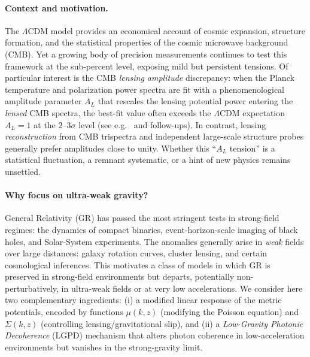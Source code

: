 \paragraph{Context and motivation.}
The $\Lambda$CDM model provides an economical account of cosmic expansion, structure formation, and the statistical properties of the cosmic microwave background (CMB). Yet a growing body of precision measurements continues to test this framework at the sub-percent level, exposing mild but persistent tensions. Of particular interest is the CMB \emph{lensing amplitude} discrepancy: when the Planck temperature and polarization power spectra are fit with a phenomenological amplitude parameter $A_L$ that rescales the lensing potential power entering the \emph{lensed} CMB spectra, the best-fit value often exceeds the $\Lambda$CDM expectation $A_L=1$ at the $2$--$3\sigma$ level (see e.g.\ \cite{Planck2018_params,Planck2018_lensing} and follow-ups). In contrast, lensing \emph{reconstruction} from CMB trispectra and independent large-scale structure probes generally prefer amplitudes close to unity. Whether this ``$A_L$ tension'' is a statistical fluctuation, a remnant systematic, or a hint of new physics remains unsettled.

\paragraph{Why focus on ultra-weak gravity?}
General Relativity (GR) has passed the most stringent tests in strong-field regimes: the dynamics of compact binaries, event-horizon-scale imaging of black holes, and Solar-System experiments. The anomalies generally arise in \emph{weak} fields over large distances: galaxy rotation curves, cluster lensing, and certain cosmological inferences. This motivates a class of models in which GR is preserved in strong-field environments but departs, potentially non-perturbatively, in ultra-weak fields or at very low accelerations. We consider here two complementary ingredients: (i) a modified linear response of the metric potentials, encoded by functions $\mu(k,z)$ (modifying the Poisson equation) and $\Sigma(k,z)$ (controlling lensing/gravitational slip), and (ii) a \emph{Low-Gravity Photonic Decoherence} (LGPD) mechanism that alters photon coherence in low-acceleration environments but vanishes in the strong-gravity limit.

